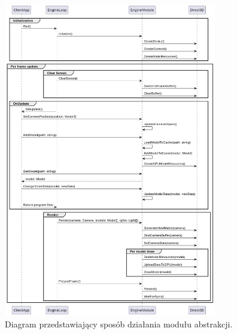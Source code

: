 \begin{figure}[ht!]
	\centering
	\includegraphics[width=350px]{uml/module_type_final.png}
	\caption{Diagram przedstawiający sposób działania modułu abstrakcji.}
	\label{UML_Sequence_Module_Final}
\end{figure}